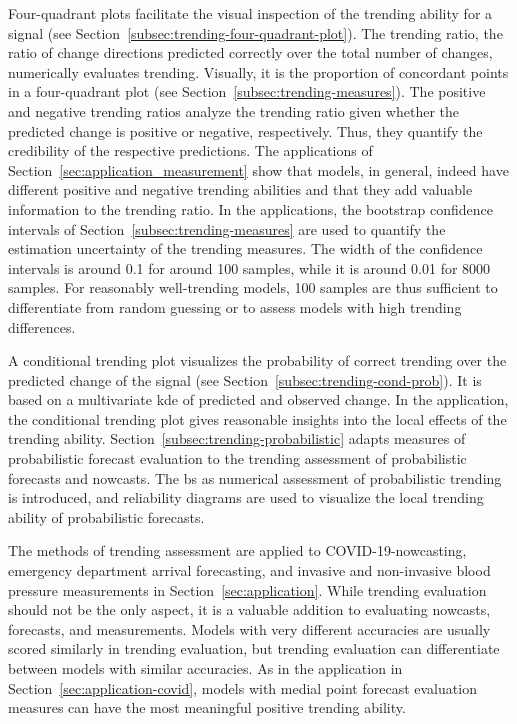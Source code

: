 \documentclass[pdflatex]{sn-jnl}
\theoremstyle{plain}%
\theoremstyle{definition}
\begin{document}
Four-quadrant plots facilitate the visual inspection of the trending ability for a signal (see Section~\ref{subsec:trending-four-quadrant-plot}).
The trending ratio, the ratio of change directions predicted correctly over the total number of changes, numerically evaluates trending.
Visually, it is the proportion of concordant points in a four-quadrant plot (see Section~\ref{subsec:trending-measures}).
The positive and negative trending ratios analyze the trending ratio given whether the predicted change is positive or negative, respectively.
Thus, they quantify the credibility of the respective predictions.
The applications of Section~\ref{sec:application_measurement} show that models, in general, indeed have different positive and negative trending abilities and that they add valuable information to the trending ratio.
In the applications, the bootstrap confidence intervals of Section~\ref{subsec:trending-measures} are used to quantify the estimation uncertainty of the trending measures.
The width of the confidence intervals is around 0.1 for around 100 samples, while it is around 0.01 for 8000 samples.
For reasonably well-trending models, 100 samples are thus sufficient to differentiate from random guessing or to assess models with high trending differences.

A conditional trending plot visualizes the probability of correct trending over the predicted change of the signal (see Section~\ref{subsec:trending-cond-prob}).
It is based on a multivariate \acf{kde} of predicted and observed change.
In the application, the conditional trending plot gives reasonable insights into the local effects of the trending ability.
Section~\ref{subsec:trending-probabilistic} adapts measures of probabilistic forecast evaluation to the trending assessment of probabilistic forecasts and nowcasts.
The \acf{bs} as numerical assessment of probabilistic trending is introduced, and reliability diagrams are used to visualize the local trending ability of probabilistic forecasts.

The methods of trending assessment are applied to COVID-19-nowcasting, emergency department arrival forecasting, and invasive and non-invasive blood pressure measurements in Section~\ref{sec:application}.
While trending evaluation should not be the only aspect, it is a valuable addition to evaluating nowcasts, forecasts, and measurements.
Models with very different accuracies are usually scored similarly in trending evaluation, but trending evaluation can differentiate between models with similar accuracies.
As in the application in Section~\ref{sec:application-covid}, models with medial point forecast evaluation measures can have the most meaningful positive trending ability.
\end{document}
